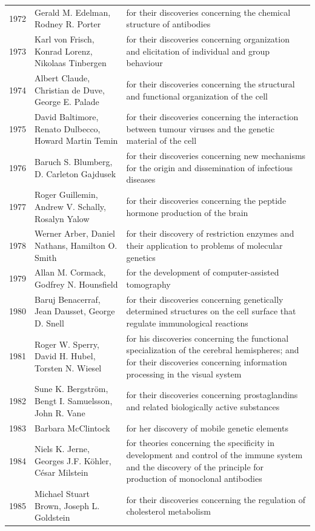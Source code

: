 \documentclass[12pt,a4paper]{book}
\begin{document}
{\begin{longtable}{cp{3.2cm}p{5.5cm}}
1972 & Gerald M. Edelman, Rodney R. Porter & for their discoveries concerning the chemical structure of antibodies \\
1973 & Karl von Frisch, Konrad Lorenz, Nikolaas Tinbergen & for their discoveries concerning organization and elicitation of individual and group behaviour \\
1974 & Albert Claude, Christian de Duve, George E. Palade & for their discoveries concerning the structural and functional organization of the cell \\
1975 & David Baltimore, Renato Dulbecco, Howard Martin Temin & for their discoveries concerning the interaction between tumour viruses and the genetic material of the cell \\
1976 & Baruch S. Blumberg, D. Carleton Gajdusek & for their discoveries concerning new mechanisms for the origin and dissemination of infectious diseases \\
1977 & Roger Guillemin, Andrew V. Schally, Rosalyn Yalow & for their discoveries concerning the peptide hormone production of the brain \\
1978 & Werner Arber, Daniel Nathans, Hamilton O. Smith & for their discovery of restriction enzymes and their application to problems of molecular genetics \\
1979 & Allan M. Cormack, Godfrey N. Hounsfield & for the development of computer-assisted tomography \\
1980 & Baruj Benacerraf, Jean Dausset, George D. Snell & for their discoveries concerning genetically determined structures on the cell surface that regulate immunological reactions \\
1981 & Roger W. Sperry, David H. Hubel, Torsten N. Wiesel & for his discoveries concerning the functional specialization of the cerebral hemispheres; and for their discoveries concerning information processing in the visual system \\
1982 & Sune K. Bergstr\"om, Bengt I. Samuelsson, John R. Vane & for their discoveries concerning prostaglandins and related biologically active substances \\
1983 & Barbara McClintock & for her discovery of mobile genetic elements \\
1984 & Niels K. Jerne, Georges J.F. K\"ohler, C\'esar Milstein & for theories concerning the specificity in development and control of the immune system and the discovery of the principle for production of monoclonal antibodies \\
1985 & Michael Stuart Brown, Joseph L. Goldstein & for their discoveries concerning the regulation of cholesterol metabolism \\

\end{longtable}}
\end{document}
